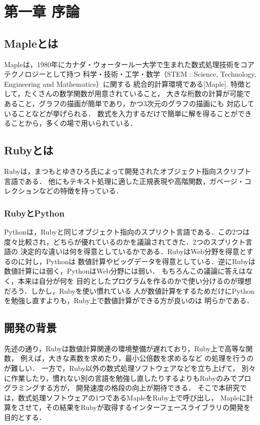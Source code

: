 \section{第一章 序論}
\subsection{Mapleとは}
Mapleは，1980年にカナダ・ウォータールー大学で生まれた数式処理技術をコアテクノロジーとして持つ
科学・技術・工学・数学（STEM : Science, Technology, Engineering and Mathematics）に関する
統合的計算環境である[Maple].
特徴として，たくさんの数学関数が用意されていること，
大きな桁数の計算が可能であること，グラフの描画が簡単であり，かつ3次元のグラフの描画にも
対応していることなどが挙げられる．
数式を入力するだけで簡単に解を得ることができることから，多くの場で用いられている．

\subsection{Rubyとは}
Rubyは，まつもとゆきひろ氏によって開発されたオブジェクト指向スクリプト言語である．
他にもテキスト処理に適した正規表現や高階関数，ガベージ・コレクションなどの特徴を持っている．

\subsubsection{RubyとPython}
Pythonは，Rubyと同じオブジェクト指向のスプリクト言語である．この2つは
度々比較され，どちらが優れているのかを議論されてきた．2つのスプリクト言語の
決定的な違いは何を得意としているかである．RubyはWeb分野を得意とするのに対し，Pythonは
数値計算やビッグデータを得意としている．逆にRubyは数値計算には弱く，PythonはWeb分野には弱い．
もちろんこの議論に答えはなく，本来は自分が何を
目的としたプログラムを作るのかで使い分けるのが理想だろう．しかし，Rubyを使い慣れている
人が数値計算をするためだけにPythonを勉強し直すよりも，Ruby上で数値計算ができる方が良いのは
明らかである．

\subsection{開発の背景}
先述の通り，Rubyは数値計算関連の環境整備が遅れており，Ruby上で高等な関数，
例えば，大きな素数を求めたり，最小公倍数を求めるなど
の処理を行うのが難しい．
一方で，Ruby以外の数式処理ソフトウェアなどを立ち上げて，
別々に作業したり，慣れない別の言語を勉強し直したりするよりもRubyのみでプログラミングする方が，
開発速度の格段の向上が期待できる．
そこで本研究では，数式処理ソフトウェアの1つであるMapleをRuby上で呼び出し，
Mapleに計算をさせて，その結果をRubyが取得するインターフェースライブラリの開発を目的とする．

